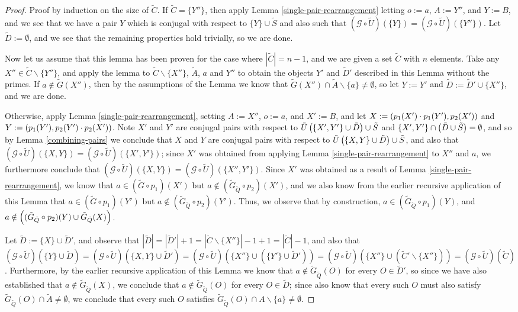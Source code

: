 \documentclass[twocolumn,showpacs,preprintnumbers,amsmath,amssymb,nofootinbib,pra,floatfix]{revtex4-1}
\newcommand{\set}{\tilde}
\newcommand{\genfun}{\mathcal{G}}
\begin{document}
\begin{proof}
Proof by induction on the size of $\set C$.  If $\set C=\{Y''\}$, then apply Lemma \ref{single-pair-rearrangement} letting $o:=a$, $A:=Y''$, and $Y:=B$, and we see that we have a pair $Y$ which is conjugal with respect to $\{Y\}\cup\set S$ and also such that $(\genfun\circ\set U)(\{Y\})=(\genfun\circ\set U)(\{Y''\})$.  Let $\set D:=\emptyset$, and we see that the remaining properties hold trivially, so we are done.

Now let us assume that this lemma has been proven for the case where $|\set C|=n-1$, and we are given a set $\set C$ with $n$ elements.  Take any $X''\in\set C\backslash\{Y''\}$, and apply the lemma to $\set C\backslash \{X''\}$, $\set A$, $a$ and $Y''$ to obtain the objects $Y'$ and $\set D'$ described in this Lemma without the primes.  If $a\notin\set G(X'')$, then by the assumptions of the Lemma we know that $\set G(X'') \cap \set A\backslash \{a\} \ne \emptyset$, so let $Y:=Y'$ and $\set D:=\set D'\cup\{X''\}$, and we are done.

Otherwise, apply Lemma \ref{single-pair-rearrangement}, setting $A:=X''$, $o:=a$, and $X':=B$, and let $X:=\left(p_1(X')\cdot p_1(Y'),p_2(X')\right)$ and $Y:=\left(p_1(Y'),p_2(Y')\cdot p_2(X')\right)$.  Note $X'$ and $Y'$ are conjugal pairs with respect to $\set U\paren{\{X',Y'\}\cup\set D}\cup\set S$ and $\{X',Y'\}\cap \paren{\set D\cup\set S}=\emptyset$, and so by Lemma \ref{combining-pairs} we conclude that $X$ and $Y$ are conjugal pairs with respect to $\set U\paren{\{X,Y\}\cup\set D}\cup\set S$, and also that $(\genfun\circ\set U)(\{X,Y\})=(\genfun\circ\set U)(\{X',Y'\})$;  since $X'$ was obtained from applying Lemma \ref{single-pair-rearrangement} to $X''$ and $a$, we furthermore conclude that $(\genfun\circ\set U)(\{X,Y\})=(\genfun\circ\set U)(\{X'',Y'\})$.  Since $X'$ was obtained as a result of Lemma \ref{single-pair-rearrangement}, we know that $a\in (\set G \circ p_1)(X')$ but $a\notin (\set G_{\set Q} \circ p_2)(X')$, and we also know from the earlier recursive application of this Lemma that $a\in (\set G \circ p_1)(Y')$ but $a\notin (\set G_{\set Q} \circ p_2)(Y')$.  Thus, we observe that by construction, $a\in (\set G_{\set Q} \circ p_1)(Y)$, and $a\notin \paren{(\set G_{\set Q} \circ p_2)(Y) \cup \set G_{\set Q}(X)}$.

Let $\set D:=\{X\}\cup\set D'$, and observe that $|\set D|=|\set D'|+1=|\set C\backslash \{X''\}|-1+1=|\set C|-1$, and also that $(\genfun\circ\set U)(\{Y\}\cup\set D)=(\genfun\circ\set U)(\{X,Y\}\cup\set D')=(\genfun\circ\set U)(\{X''\}\cup(\{Y'\}\cup\set D'))=(\genfun\circ\set U)(\{X''\}\cup(\set C'\backslash\{X''\}))=(\genfun\circ\set U)(\set C)$.  Furthermore, by the earlier recursive application of this Lemma we know that $a\notin\set G_{\set Q}(O)$ for every $O\in \set D'$, so since we have also established that $a\notin \set G_{\set Q}(X)$, we conclude that $a\notin\set G_{\set Q}(O)$ for every $O\in \set D$;  since also know that every such $O$ must also satisfy $\set G_{\set Q}(O)\cap \set A \ne \emptyset$, we conclude that every such $O$ satisfies $\set G_{\set Q}(O) \cap A\backslash\{a\}\ne\emptyset$.
\end{proof}
\end{document}
